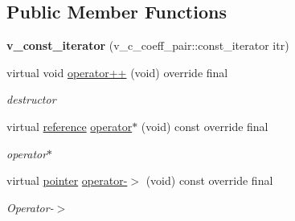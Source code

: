 \subsection*{Public Member Functions}
\begin{DoxyCompactItemize}
\item 
\mbox{\label{class_s_m_spp__di__unipi__it_1_1_linear_function_1_1v__const__iterator_aa70523c5d2a63605096ab109ebc62196}} 
{\bfseries v\+\_\+const\+\_\+iterator} (v\+\_\+c\+\_\+coeff\+\_\+pair\+::const\+\_\+iterator itr)
\item 
virtual void \mbox{\hyperlink{class_s_m_spp__di__unipi__it_1_1_linear_function_1_1v__const__iterator_af860fe44bc54c0cbca8e733ab0e954e0}{operator++}} (void) override final
\begin{DoxyCompactList}\small\item\em destructor \end{DoxyCompactList}\item 
\mbox{\label{class_s_m_spp__di__unipi__it_1_1_linear_function_1_1v__const__iterator_aea4d50ffc7b90999612dafe5edb8ca59}} 
virtual \mbox{\hyperlink{class_s_m_spp__di__unipi__it_1_1_variable}{reference}} \mbox{\hyperlink{class_s_m_spp__di__unipi__it_1_1_linear_function_1_1v__const__iterator_aea4d50ffc7b90999612dafe5edb8ca59}{operator$\ast$}} (void) const override final
\begin{DoxyCompactList}\small\item\em operator$\ast$ \end{DoxyCompactList}\item 
\mbox{\label{class_s_m_spp__di__unipi__it_1_1_linear_function_1_1v__const__iterator_af090a4094bcbcae8966745a92278976b}} 
virtual \mbox{\hyperlink{class_s_m_spp__di__unipi__it_1_1_variable}{pointer}} \mbox{\hyperlink{class_s_m_spp__di__unipi__it_1_1_linear_function_1_1v__const__iterator_af090a4094bcbcae8966745a92278976b}{operator-\/$>$}} (void) const override final
\begin{DoxyCompactList}\small\item\em Operator-\/$>$ \end{DoxyCompactList}\item 
\mbox{\label{class_s_m_spp__di__unipi__it_1_1_linear_function_1_1v__const__iterator_a7a2398b23f78389d37cc9cc63cbc6d62}} 

\end{DoxyCompactItemize}
